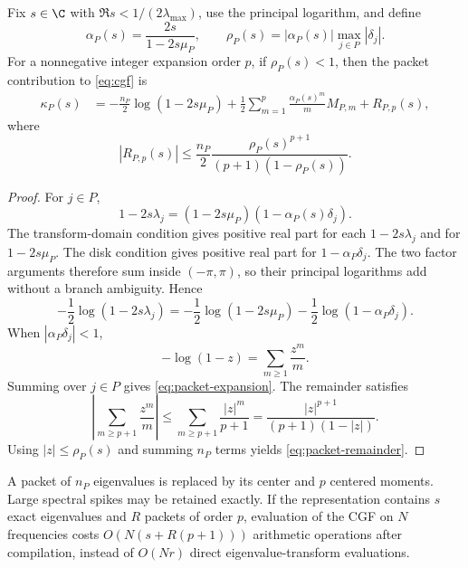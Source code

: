 \begin{theorem}
\label{thm:packet}
Fix $s\in\C$ with $\Re s<1/(2\lambda_{\max})$, use the principal logarithm, and define
\begin{equation}
\alpha_P(s)=\frac{2s}{1-2s\mu_P},
\qquad
\rho_P(s)=|\alpha_P(s)|\max_{j\in P}|\delta_j|.
\label{eq:alpha-rho}
\end{equation}
For a nonnegative integer expansion order $p$, if $\rho_P(s)<1$, then the packet contribution to \eqref{eq:cgf} is
\begin{align}
\kappa_P(s)
&=-\frac{n_P}{2}\log(1-2s\mu_P)
+\frac12\sum_{m=1}^{p}
\frac{\alpha_P(s)^m}{m}M_{P,m}
+R_{P,p}(s),
\label{eq:packet-expansion}
\end{align}
where
\begin{equation}
|R_{P,p}(s)|
\le
\frac{n_P}{2}
\frac{\rho_P(s)^{p+1}}{(p+1)(1-\rho_P(s))}.
\label{eq:packet-remainder}
\end{equation}
\end{theorem}

\begin{proof}
For $j\in P$,
\[
1-2s\lambda_j
=(1-2s\mu_P)(1-\alpha_P(s)\delta_j).
\]
The transform-domain condition gives positive real part for each
\(1-2s\lambda_j\) and for \(1-2s\mu_P\).  The disk condition gives
positive real part for \(1-\alpha_P\delta_j\).  The two factor arguments
therefore sum inside \((-\pi,\pi)\), so their principal logarithms add
without a branch ambiguity.  Hence
\[
-\frac12\log(1-2s\lambda_j)
=-\frac12\log(1-2s\mu_P)
-\frac12\log(1-\alpha_P\delta_j).
\]
When $|\alpha_P\delta_j|<1$,
\[
-\log(1-z)=\sum_{m\ge1}\frac{z^m}{m}.
\]
Summing over $j\in P$ gives \eqref{eq:packet-expansion}. The remainder satisfies
\[
\left|\sum_{m\ge p+1}\frac{z^m}{m}\right|
\le
\sum_{m\ge p+1}\frac{|z|^m}{p+1}
=\frac{|z|^{p+1}}{(p+1)(1-|z|)}.
\]
Using $|z|\le\rho_P(s)$ and summing $n_P$ terms yields \eqref{eq:packet-remainder}.
\end{proof}

\begin{remark}\label{claim:final-26-3}
A packet of $n_P$ eigenvalues is replaced by its center and $p$ centered moments. Large spectral spikes may be retained exactly. If the representation contains $s$ exact eigenvalues and $R$ packets of order $p$, evaluation of the CGF on $N$ frequencies costs $O(N(s+R(p+1)))$ arithmetic operations after compilation, instead of $O(Nr)$ direct eigenvalue-transform evaluations.
\end{remark}

